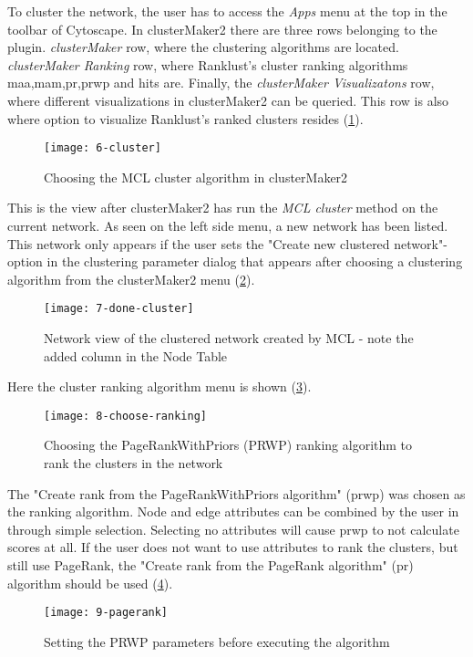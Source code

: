 To cluster the network, the user has to access the \textit{Apps} menu at the top
in the toolbar of Cytoscape. In clusterMaker2 there are three rows belonging
to the plugin. \textit{clusterMaker} row, where the clustering algorithms are
located. \textit{clusterMaker Ranking} row, where Ranklust's cluster ranking
algorithms \gls{maa},\gls{mam},\gls{pr},\gls{prwp} and \gls{hits} are. Finally,
the \textit{clusterMaker Visualizatons} row, where different visualizations in
clusterMaker2 can be queried. This row is also where option to visualize
Ranklust's ranked clusters resides (\ref{fig:cluster}).
\begin{figure}[H]
    \texttt{[image: 6-cluster]}
    \caption{Choosing the MCL cluster algorithm in clusterMaker2}
    \label{fig:cluster}
\end{figure}

This is the view after clusterMaker2 has run the \textit{MCL cluster} method on
the current network. As seen on the left side menu, a new network has been
listed. This network only appears if the user sets the "Create new clustered
network"-option in the clustering parameter dialog that appears after choosing a
clustering algorithm from the clusterMaker2 menu (\ref{fig:done-cluster}).
\begin{figure}[H]
    \texttt{[image: 7-done-cluster]}
    \caption{Network view of the clustered network created by MCL - note the
    added column in the Node Table}
    \label{fig:done-cluster}
\end{figure}

Here the cluster ranking algorithm menu is shown (\ref{fig:choose-ranking}).
\begin{figure}[H]
    \texttt{[image: 8-choose-ranking]}
    \caption{Choosing the PageRankWithPriors (PRWP) ranking algorithm to rank
    the clusters in the network}
    \label{fig:choose-ranking}
\end{figure}

The "Create rank from the PageRankWithPriors algorithm" (\gls{prwp}) was chosen
as the ranking algorithm. Node and edge attributes can be combined by the user
in through simple selection. Selecting no attributes will cause \gls{prwp} to
not calculate scores at all. If the user does not want to use attributes to rank
the clusters, but still use PageRank, the "Create rank from the PageRank
algorithm" (\gls{pr}) algorithm should be used (\ref{fig:pagerank}).
\begin{figure}[H]
    \texttt{[image: 9-pagerank]}
    \caption{Setting the PRWP parameters before executing the algorithm}
    \label{fig:pagerank}
\end{figure}


